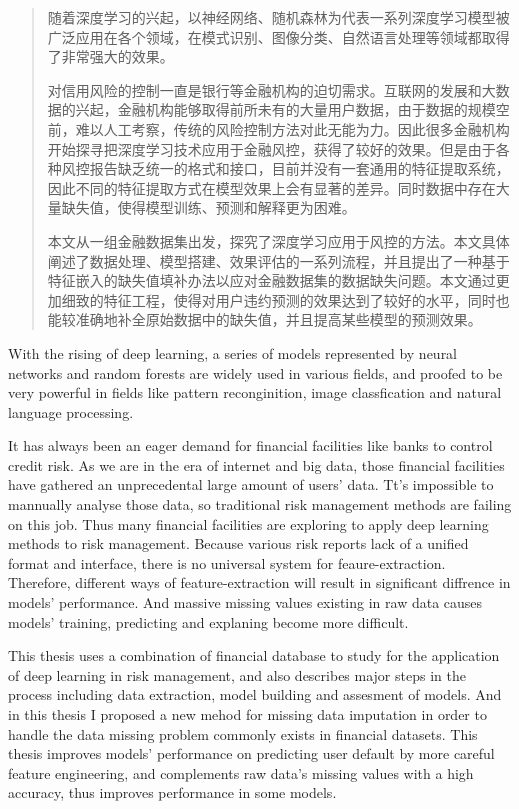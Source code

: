 \begin{abstract}
随着深度学习的兴起，以神经网络、随机森林为代表一系列深度学习模型被广泛应用在各个领域，在模式识别、图像分类、自然语言处理等领域都取得了非常强大的效果。

对信用风险的控制一直是银行等金融机构的迫切需求。互联网的发展和大数据的兴起，金融机构能够取得前所未有的大量用户数据，由于数据的规模空前，难以人工考察，传统的风险控制方法对此无能为力。因此很多金融机构开始探寻把深度学习技术应用于金融风控，获得了较好的效果。但是由于各种风控报告缺乏统一的格式和接口，目前并没有一套通用的特征提取系统，因此不同的特征提取方式在模型效果上会有显著的差异。同时数据中存在大量缺失值，使得模型训练、预测和解释更为困难。

本文从一组金融数据集出发，探究了深度学习应用于风控的方法。本文具体阐述了数据处理、模型搭建、效果评估的一系列流程，并且提出了一种基于特征嵌入的缺失值填补办法以应对金融数据集的数据缺失问题。本文通过更加细致的特征工程，使得对用户违约预测的效果达到了较好的水平，同时也能较准确地补全原始数据中的缺失值，并且提高某些模型的预测效果。

\end{abstract}

\begin{enabstract}
With the rising of deep learning, a series of models represented by neural networks and random forests are widely used in various fields, and proofed to be very powerful in fields like pattern reconginition, image classfication and natural language processing.

It has always been an eager demand for financial facilities like banks to control credit risk. As we are in the era of internet and big data, those financial facilities have gathered an unprecedental large amount of users' data. Tt's impossible to mannually analyse those data, so traditional risk management methods are failing on this job. Thus many financial facilities are exploring to apply deep learning methods to risk management. Because various risk reports lack of a unified format and interface, there is no universal system for feaure-extraction. Therefore, different ways of feature-extraction will result in significant diffrence in models' performance. And massive missing values existing in raw data causes models' training, predicting and explaning become more difficult.

This thesis uses a combination of financial database to study for the application of deep learning in risk management, and also describes major steps in the process including data extraction, model building and assesment of models. And in this thesis I proposed a new mehod for missing data imputation in order to handle the data missing problem commonly exists in financial datasets. This thesis improves models' performance on predicting user default by more careful feature engineering, and complements raw data's missing values with a high accuracy, thus improves performance in some models.

\end{enabstract}